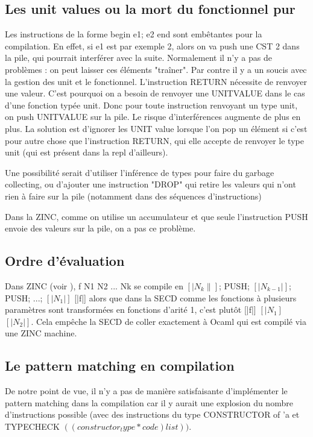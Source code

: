 \documentclass[paper=a4, fontsize=11pt, twocolumn]{article}
\begin{document}
\subsection{Les unit values ou la mort du fonctionnel pur}
Les instructions de la forme 
begin e1; e2 end sont embêtantes pour la compilation. En effet, si e1 est par exemple 2, alors on va push une CST 2 dans la pile, qui pourrait interférer avec la suite.
Normalement il n'y a pas de problèmes : on peut laisser ces éléments "traîner". Par contre il y a un soucis avec la gestion des unit et le fonctionnel.
L'instruction RETURN nécessite de renvoyer une valeur. C'est pourquoi on a besoin de renvoyer une UNITVALUE dans le cas d'une fonction typée unit. Donc pour toute instruction renvoyant un type unit, on push UNITVALUE sur la pile. Le risque d'interférences augmente de plus en plus.
La solution est d'ignorer les UNIT value lorsque l'on pop un élément si c'est pour autre chose que l'instruction RETURN, qui elle accepte de renvoyer le type unit (qui est présent dans la repl d'ailleurs).

Une possibilité serait d'utiliser l'inférence de types pour faire du garbage collecting, ou d'ajouter une instruction "DROP" qui retire les valeurs qui n'ont rien à faire sur la pile (notamment dans des séquences d'instructions)

Dans la ZINC, comme on utilise un accumulateur et que seule l'instruction PUSH envoie des valeurs sur la pile, on a pas ce problème.

\subsection{Ordre d'évaluation}
Dans ZINC (voir \cite{leroyzinc}), f N1 N2 ... Nk se compile en $[|N_k\|]$; PUSH; $[|N_{k-1}|]$; PUSH; ...; $[|N_1|]$ [|f|] alors que dans la SECD comme les fonctions à plusieurs paramètres sont transformées en fonctions d'arité 1, c'est plutôt
[|f|] $[|N_1]$ $[|N_2|]$. Cela empêche la SECD de coller exactement à Ocaml qui est compilé via une ZINC machine.

\subsection{Le pattern matching en compilation}
De notre point de vue, il n'y a pas de manière satisfaisante d'implémenter le pattern matching dans la compilation car il y aurait une explosion du nombre d'instructions possible (avec des instructions du type CONSTRUCTOR of 'a et TYPECHECK $((constructor_type * code) list))$.
\end{document}
